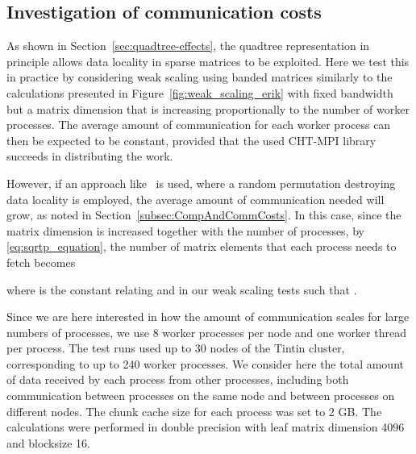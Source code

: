 \documentclass{elsarticle}
\begin{document}
\subsection{Investigation of communication costs}\label{subsec:communication}

As shown in Section~\ref{sec:quadtree-effects}, the quadtree
representation in principle allows data locality in sparse matrices to
be exploited. Here we test this in practice by considering weak
scaling using banded matrices similarly to the calculations presented
in Figure~\ref{fig:weak_scaling_erik} with fixed bandwidth but a
matrix dimension that is increasing proportionally to the number of
worker processes.  The average amount of communication for each worker
process can then be expected to be constant, provided that the used
CHT-MPI library succeeds in distributing the work.


However, if an approach like~\cite{BulucGilbert2012, Borstnik2014} is
used, where a random permutation destroying data locality is employed,
the average amount of communication needed will grow, as noted in
Section~\ref{subsec:CompAndCommCosts}.  In this case, since the matrix
dimension is increased together with the number of processes, by
\eqref{eq:sqrtp_equation}, the number of matrix elements that each
process needs to fetch becomes

where  is the constant relating  and  in our weak scaling
tests such that .



Since we are here interested in how the amount of communication
scales for large numbers of processes, we use 8 worker processes per
node and one worker thread per process. 
The test runs used up to 30 nodes of the Tintin cluster, corresponding
to up to 240 worker processes.
We consider here the total amount of data received by each process
from other processes, including both communication between processes
on the same node and between processes on different nodes.
The chunk cache size for each process was set to 2 GB.
The calculations were performed in double precision with leaf matrix
dimension 4096 and blocksize 16.
\end{document}

